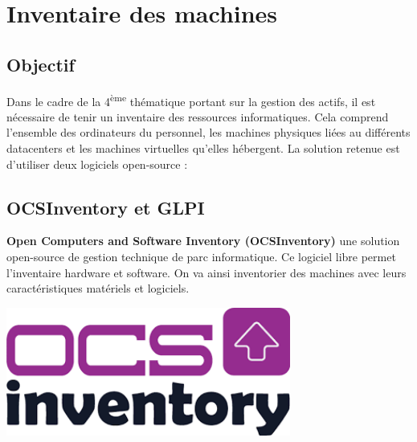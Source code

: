 \documentclass[12pt, a4paper, twoside]{article}
\begin{document}
\newpage
\section{Inventaire des machines}
\subsection{Objectif}

Dans le cadre de la 4\textsuperscript{ème} thématique portant sur la gestion des actifs, il est nécessaire de tenir un inventaire des ressources informatiques. 
Cela comprend l'ensemble des ordinateurs du personnel, les machines physiques liées au différents datacenters et les machines virtuelles qu'elles hébergent.
La solution retenue est d'utiliser deux logiciels open-source :

\subsection{OCSInventory et GLPI}
\begin{minipage}{.7\textwidth}%
\textbf{Open Computers and Software Inventory (\gls{OCSInventory})} une solution open-source de gestion technique de parc informatique. 
Ce logiciel libre permet l’inventaire hardware et software. 
On va ainsi inventorier des machines avec leurs caractéristiques matériels et logiciels.
\end{minipage}%
\hfill
\begin{minipage}{.3\textwidth}%
\begin{center}
\includegraphics[width=0.7\textwidth]{src/logo_ocsinventory.png}
\end{center}
\end{minipage}%
\end{document}
